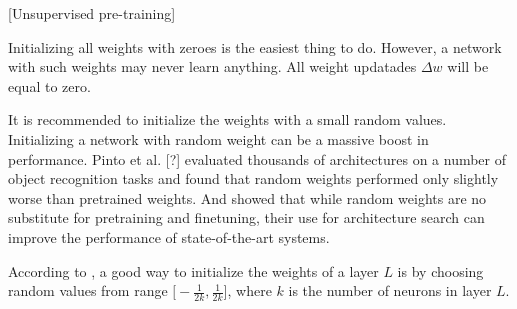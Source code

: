 [Unsupervised pre-training]

Initializing all weights with zeroes is the easiest thing to do. However, a network with such weights may never learn anything. All weight updatades $\Delta w$ will be equal to zero.

It is recommended to initialize the weights with a small random values. Initializing a network with random weight can be a massive boost in performance. Pinto et al. [?] evaluated thousands of architectures on a number of object recognition tasks and found that random weights performed only slightly worse than pretrained weights. And \cite{Saxe-et-al-TODO} showed that while random weights are no substitute for pretraining and finetuning, their use for architecture search can improve the performance of state-of-the-art systems. 

According to \cite{Trushevskyi-2014}, a good way to initialize the weights of a layer $L$ is by choosing random values from range $\big[-\frac{1}{2k}, \frac{1}{2k}\big]$, where $k$ is the number of neurons in layer $L$.
